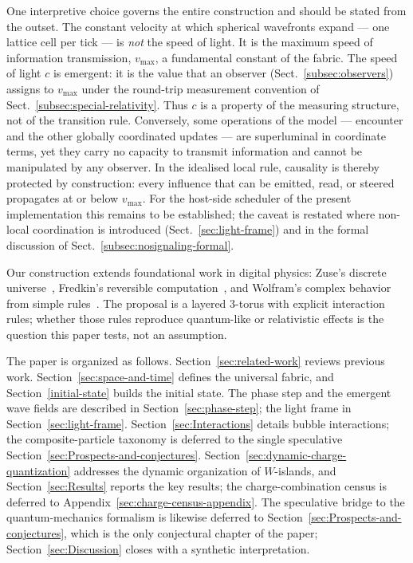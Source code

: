 \documentclass{ijuc}
\begin{document}
One interpretive choice governs the entire construction and should be stated from the outset. The constant velocity at which spherical wavefronts expand --- one lattice cell per tick --- is \emph{not} the speed of light. It is the maximum speed of information transmission, $v_{\max}$, a fundamental constant of the fabric. The speed of light $c$ is emergent: it is the value that an observer (Sect.~\ref{subsec:observers}) assigns to $v_{\max}$ under the round-trip measurement convention of Sect.~\ref{subsec:special-relativity}. Thus $c$ is a property of the measuring structure, not of the transition rule. Conversely, some operations of the model --- encounter and the other globally coordinated updates --- are superluminal in coordinate terms, yet they carry no capacity to transmit information and cannot be manipulated by any observer. In the idealised local rule, causality is thereby protected by construction: every influence that can be emitted, read, or steered propagates at or below $v_{\max}$.  For the host-side scheduler of the present implementation this remains to be established; the caveat is restated where non-local coordination is introduced (Sect.~\ref{sec:light-frame}) and in the formal discussion of Sect.~\ref{subsec:nosignaling-formal}.

Our construction extends foundational work in digital physics: Zuse's discrete universe~\cite{zuse}, Fredkin's reversible computation~\cite{fredkin}, and Wolfram's complex behavior from simple rules~\cite{wolfram}. The proposal is a layered 3-torus with explicit interaction rules; whether those rules reproduce quantum-like or relativistic effects is the question this paper tests, not an assumption.

The paper is organized as follows. Section~\ref{sec:related-work} reviews previous work. Section~\ref{sec:space-and-time} defines the universal fabric, and Section~\ref{initial-state} builds the initial state. The phase step and the emergent wave fields are described in Section~\ref{sec:phase-step}; the light frame in Section~\ref{sec:light-frame}. Section~\ref{sec:Interactions} details bubble interactions; the composite-particle taxonomy is deferred to the single speculative Section~\ref{sec:Prospects-and-conjectures}. Section~\ref{sec:dynamic-charge-quantization} addresses the dynamic organization of $W$-islands, and Section~\ref{sec:Results} reports the key results; the charge-combination census is deferred to Appendix~\ref{sec:charge-census-appendix}. The speculative bridge to the quantum-mechanics formalism is likewise deferred to Section~\ref{sec:Prospects-and-conjectures}, which is the only conjectural chapter of the paper; Section~\ref{sec:Discussion} closes with a synthetic interpretation.
\end{document}
